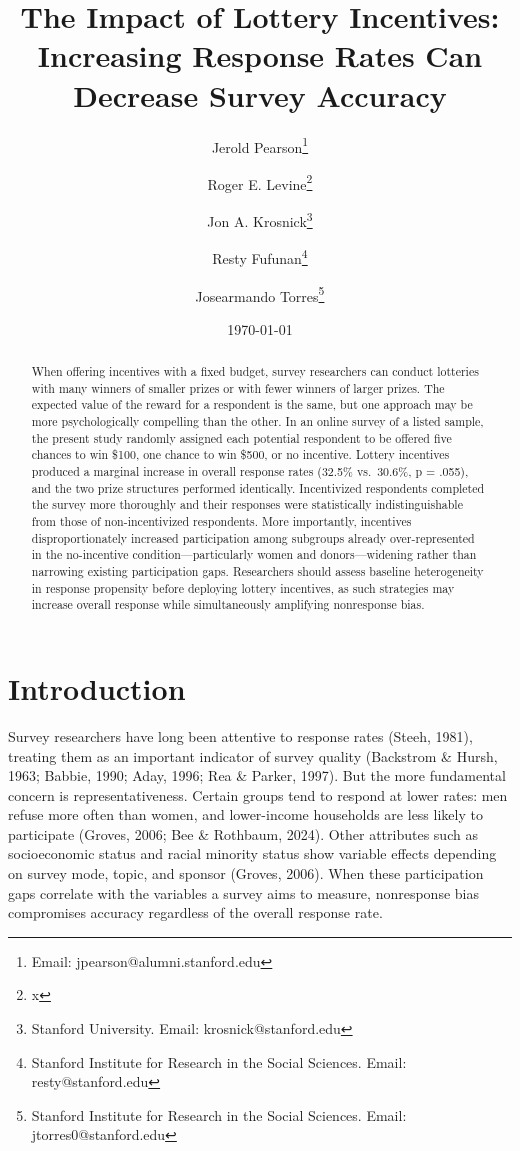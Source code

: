 \documentclass[12pt]{article}
\title{\Large\textbf{The Impact of Lottery Incentives:\\ 
Increasing Response Rates Can Decrease Survey Accuracy}}
\author{
    Jerold Pearson\thanks{Email: jpearson@alumni.stanford.edu} 
    \and 
    Roger E. Levine\thanks{x}
    \and
    Jon A. Krosnick\thanks{Stanford University. Email: krosnick@stanford.edu}
    \and
    Resty Fufunan\thanks{Stanford Institute for Research in the Social Sciences. Email: resty@stanford.edu}
    \and
    Josearmando Torres\thanks{Stanford Institute for Research in the Social Sciences. Email: jtorres0@stanford.edu}
}
\date{\today}
\begin{document}
\maketitle


\begin{abstract}
\noindent
When offering incentives with a fixed budget, survey researchers can conduct lotteries with many winners of smaller prizes or with fewer winners of larger prizes. The expected value of the reward for a respondent is the same, but one approach may be more psychologically compelling than the other. In an online survey of a listed sample, the present study randomly assigned each potential respondent to be offered five chances to win \$100, one chance to win \$500, or no incentive. Lottery incentives produced a marginal increase in overall response rates (32.5\% vs.\ 30.6\%, p = .055), and the two prize structures performed identically. Incentivized respondents completed the survey more thoroughly and their responses were statistically indistinguishable from those of non-incentivized respondents. More importantly, incentives disproportionately increased participation among subgroups already over-represented in the no-incentive condition---particularly women and donors---widening rather than narrowing existing participation gaps. Researchers should assess baseline heterogeneity in response propensity before deploying lottery incentives, as such strategies may increase overall response while simultaneously amplifying nonresponse bias.

\end{abstract}

\thispagestyle{empty}  %
\newpage
\setcounter{page}{1}


\section{Introduction}

Survey researchers have long been attentive to response rates (Steeh, 1981), treating them as an important indicator of survey quality (Backstrom \& Hursh, 1963; Babbie, 1990; Aday, 1996; Rea \& Parker, 1997). But the more fundamental concern is representativeness. Certain groups tend to respond at lower rates: men refuse more often than women, and lower-income households are less likely to participate (Groves, 2006; Bee \& Rothbaum, 2024). Other attributes such as socioeconomic status and racial minority status show variable effects depending on survey mode, topic, and sponsor (Groves, 2006). When these participation gaps correlate with the variables a survey aims to measure, nonresponse bias compromises accuracy regardless of the overall response rate.
\end{document}

